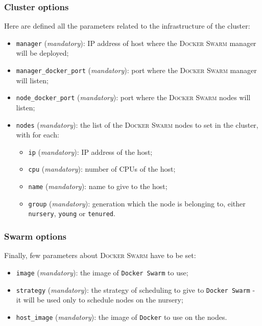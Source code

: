 \subsubsection{Cluster options}

Here are defined all the parameters related to the infrastructure of the cluster:

\begin{itemize}
  \item \texttt{manager} (\emph{mandatory}): IP address of host where the \textsc{Docker Swarm} manager will be deployed;
  \item \texttt{manager\_docker\_port} (\emph{mandatory}): port where the \textsc{Docker Swarm} manager will listen;
  \item \texttt{node\_docker\_port} (\emph{mandatory}): port where the \textsc{Docker Swarm} nodes will listen;
  \item \texttt{nodes} (\emph{mandatory}): the list of the \textsc{Docker Swarm} nodes to set in the cluster, with for each:
  \begin{itemize}
    \item \texttt{ip} (\emph{mandatory}): IP address of the host;
    \item \texttt{cpu} (\emph{mandatory}): number of CPUs of the host;
    \item \texttt{name} (\emph{mandatory}): name to give to the host;
    \item \texttt{group} (\emph{mandatory}): generation which the node is belonging to, either \texttt{nursery}, \texttt{young} or \texttt{tenured}.
  \end{itemize}
\end{itemize}

\subsubsection{Swarm options}

Finally, few parameters about \textsc{Docker Swarm} have to be set:

\begin{itemize}
  \item \texttt{image} (\emph{mandatory}): the image of \texttt{Docker Swarm} to use;
  \item \texttt{strategy} (\emph{mandatory}): the strategy of scheduling to give to \texttt{Docker Swarm} - it will be used only to schedule nodes on the nursery;
  \item \texttt{host\_image} (\emph{mandatory}): the image of \texttt{Docker} to use on the nodes.
\end{itemize}
